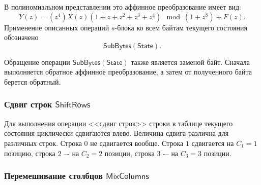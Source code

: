 В полиномиальном представлении это аффинное преобразование имеет вид:
\[Y(z)=(z^4)X(z)(1+z+z^2+z^3+z^4)\mod(1+z^8) + F(z).\]
Применение описанных операций $s$-блока ко всем байтам текущего состояния обозначено
    \[ \mathsf{SubBytes(State)}. \]

Обращение операции $\mathsf{SubBytes(State)}$ также является заменой байт. Сначала выполняется обратное аффинное преобразование, а затем от полученного байта берется обратный.


\subsubsection{Сдвиг строк $\mathsf{ShiftRows}$}

Для выполнения операции <<сдвиг строк>> строки в таблице текущего состояния циклически сдвигаются влево. Величина сдвига различна для различных строк. Строка $0$ не сдвигается вообще. Строка $1$ сдвигается на $C_1=1$ позицию, строка $2$ –- на $C_2=2$ позиции, строка $3$ -– на $C_3=3$ позиции.
%


\subsubsection{Перемешивание столбцов $\mathsf{Mix Columns}$}

